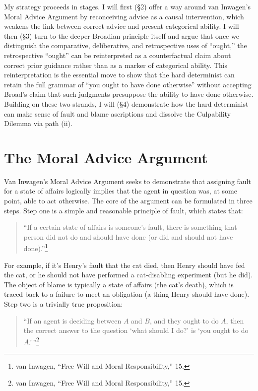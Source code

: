 My strategy proceeds in stages. I will first (§2) offer a way around van
Inwagen's Moral Advice Argument by reconceiving advice as a causal
intervention, which weakens the link between correct advice and present
categorical ability. I will then (§3) turn to the deeper Broadian
principle itself and argue that once we distinguish the comparative,
deliberative, and retrospective uses of ``ought,'' the retrospective
``ought'' can be reinterpreted as a counterfactual claim about correct
prior guidance rather than as a marker of categorical ability. This
reinterpretation is the essential move to show that the hard determinist
can retain the full grammar of ``you ought to have done otherwise''
without accepting Broad's claim that such judgments presuppose the
ability to have done otherwise. Building on these two strands, I will
(§4) demonstrate how the hard determinist can make sense of fault and
blame ascriptions and dissolve the Culpability Dilemma via path (ii).

\section{The Moral Advice Argument}

Van Inwagen's Moral Advice Argument seeks to demonstrate that assigning
fault for a state of affairs logically implies that the agent in
question was, at some point, able to act otherwise. The core of the
argument can be formulated in three steps. Step one is a simple and
reasonable principle of fault, which states that:

\vspace{-1em}
\begin{quote}
``If a certain state of affairs is someone's fault, there is something
that person did not do and should have done (or did and should not have
done).''\footnote{van Inwagen, ``Free Will and Moral Responsibility,''
  15.}
\end{quote}

\noindent For example, if it's Henry's fault that the cat died, then Henry should
have fed the cat, or he should not have performed a cat-disabling
experiment (but he did). The object of blame is typically a state of
affairs (the cat's death), which is traced back to a failure to meet an
obligation (a thing Henry should have done). Step two is a trivially
true proposition:

\vspace{-1em}

\begin{quote}
``If an agent is deciding between $A$ and $B$, and they ought to do $A$, then
the correct answer to the question `what should I do?' is `you ought to
do $A$.'\,''\footnote{van Inwagen, ``Free Will and Moral Responsibility,''
  15.}
\end{quote}

